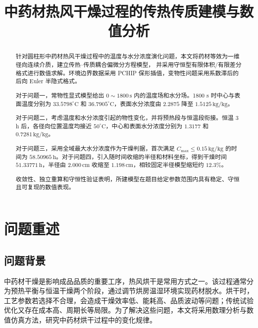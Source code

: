 \documentclass[withoutpreface,bwprint]{cumcm_thesis}
\title{中药材热风干燥过程的传热传质建模与数值分析}
\begin{document}
\maketitle
\begin{abstract}
针对圆柱形中药材热风干燥过程中的温度与水分浓度演化问题，本文将药材等效为一维径向连续介质，建立传热--传质耦合偏微分方程模型，
并采用守恒型有限体积/有限差分格式进行数值求解。环境边界数据采用 PCHIP 保形插值，变物性问题采用系数滞后的后向 Euler 半隐式格式。

对于问题一，常物性显式模型给出 \(0\sim1800\,\mathrm{s}\) 内的温度场和水分场。1800 s 时中心与表面温度分别为 \(33.5798^\circ\mathrm{C}\) 和 \(36.7905^\circ\mathrm{C}\)，表面水分浓度由 \(2.2875\) 降至 \(1.5125\,\mathrm{kg/kg}\)。

对于问题二，考虑温度和水分浓度引起的物性变化，并将预热段与恒温段衔接。恒温 3 h 后，各径向位置温度均接近 \(50^\circ\mathrm{C}\)，中心和表面水分浓度分别为 \(1.3177\) 和 \(0.7281\,\mathrm{kg/kg}\)。

对于问题三，采用全域最大水分浓度作为干燥判据，首次满足 \(C_{\max}\le0.15\,\mathrm{kg/kg}\) 的时间为 \(58.50965\,\mathrm{h}\)。对于问题四，引入随时间收缩的半径和材料坐标，得到干燥时间 \(51.33771\,\mathrm{h}\)，半径由 \(2.000\,\mathrm{cm}\) 收缩至 \(1.198\,\mathrm{cm}\)，相较固定半径模型缩短约 \(12.3\%\)。

收敛性、独立重算和守恒性验证表明，所建模型在题目给定参数范围内具有稳定、守恒且可复现的数值表现。

\end{abstract}


\section{问题重述} %
\subsection{问题背景} %

中药材干燥是影响成品品质的重要工序，热风烘干是常用方式之一。该过程通常分为预热平衡与恒温干燥两个阶段，通过调节烘房温湿环境实现药材脱水。烘干时，工艺参数若选择不合理，会造成干燥效率低、能耗高、品质波动等问题；传统试验优化又存在成本高、周期长等局限。为了解决这些问题，本文将采用数理分析与数值仿真方法，研究中药材烘干过程中的变化规律。
\end{document}
